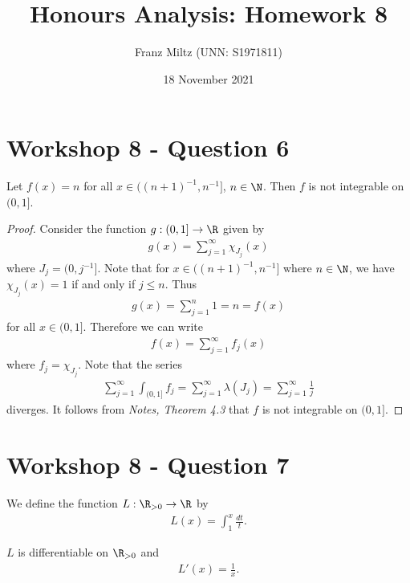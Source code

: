 \documentclass{article}
\begin{document}
\title{Honours Analysis: Homework 8}
\author{Franz Miltz (UNN: S1971811)}
\date{18 November 2021}
\maketitle

\section*{Workshop 8 - Question 6}

\begin{claim*}
   Let $f(x)=n$ for all $x\in((n+1)^{-1}, n^{-1}]$, $n\in\N$. Then $f$ is not integrable on
   $(0,1]$.
\end{claim*}
\begin{proof}
   Consider the function $g:(0,1]\to\R$ given by
   \begin{align*}
      g(x) = \sum_{j=1}^\infty \chi_{J_j}(x)
   \end{align*}
   where $J_j = (0, j^{-1}]$. Note that for $x\in((n+1)^{-1}, n^{-1}]$ where $n\in\N$,
   we have $\chi_{J_j}(x)=1$ if and only if $j\leq n$. Thus
   \begin{align*}
      g(x) = \sum_{j=1}^n 1 = n = f(x)
   \end{align*}
   for all $x\in(0,1]$. Therefore we can write
   \begin{align*}
      f(x) = \sum_{j=1}^\infty f_j(x)
   \end{align*}
   where $f_j=\chi_{J_j}$. Note that the series
   \begin{align*}
      \sum_{j=1}^\infty \int_{(0,1]} f_j = \sum_{j=1}^\infty \lambda(J_j)
      = \sum_{j=1}^\infty \frac{1}{j}
   \end{align*}
   diverges. It follows from \emph{Notes, Theorem 4.3} that $f$ is not integrable on $(0,1]$.
\end{proof}

\section*{Workshop 8 - Question 7}

We define the function $L:\R_{>0}\to\R$ by
\begin{align*}
   L(x) = \int_1^x \frac{dt}{t}.
\end{align*}

\begin{claim*}
   $L$ is differentiable on $\R_{>0}$ and
   \begin{align}
      \label{deriv}
      L'(x) = \frac{1}{x}.
   \end{align}
\end{claim*}
\end{document}
